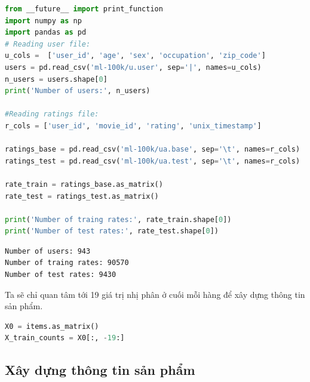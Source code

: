  
 
\begin{lstlisting}[language=Python]
from __future__ import print_function 
import numpy as np 
import pandas as pd 
# Reading user file:
u_cols =  ['user_id', 'age', 'sex', 'occupation', 'zip_code']
users = pd.read_csv('ml-100k/u.user', sep='|', names=u_cols)
n_users = users.shape[0]
print('Number of users:', n_users)

#Reading ratings file:
r_cols = ['user_id', 'movie_id', 'rating', 'unix_timestamp']

ratings_base = pd.read_csv('ml-100k/ua.base', sep='\t', names=r_cols)
ratings_test = pd.read_csv('ml-100k/ua.test', sep='\t', names=r_cols)

rate_train = ratings_base.as_matrix()
rate_test = ratings_test.as_matrix()

print('Number of traing rates:', rate_train.shape[0])
print('Number of test rates:', rate_test.shape[0])
\end{lstlisting}
\kq
\begin{lstlisting}
Number of users: 943
Number of traing rates: 90570
Number of test rates: 9430
\end{lstlisting}
Ta sẽ chỉ quan tâm tới 19 giá trị nhị phân ở cuối mỗi hàng để xây dựng thông tin sản phẩm.
\begin{lstlisting}[language=Python]
X0 = items.as_matrix() 
X_train_counts = X0[:, -19:] 
\end{lstlisting}
 
\subsection{Xây dựng thông tin sản phẩm}
 
